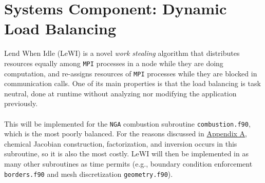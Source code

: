 \documentclass{homework}
\begin{document}
\section{\textbf{Systems Component: Dynamic Load Balancing}}
\noindent Lend When Idle \cite{LeWI_ICPP09,GARCIA2014,DLB_OpenMP_SMPS} (LeWI) is a novel \emph{work stealing} \cite{Work_Stealing} algorithm that distributes resources equally among \texttt{MPI} processes in a node while they are doing computation, and re-assigns resources of \texttt{MPI} processes while they are blocked in communication calls. One of its main properties is that the load balancing is task neutral, done at runtime without analyzing nor modifying the application previously.
\\ \\ \noindent
This will be implemented for the \texttt{NGA} combustion subroutine \texttt{combustion.f90}, which is the most poorly balanced. For the reasons discussed in \hyperref[appendixA]{Appendix A}, chemical Jacobian construction, factorization, and inversion occurs in this subroutine, so it is also the most costly. LeWI will then be implemented in as many other subroutines as time permits (e.g., boundary condition enforcement \texttt{borders.f90} and mesh discretization \texttt{geometry.f90}). 
\end{document}
